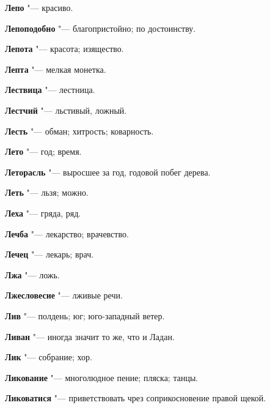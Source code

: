 \begin{mymulticols}{2}
\noindent\textbf{Лепо} "--- красиво. 




\noindent\textbf{Лепоподобно} "--- благопристойно; по достоинству. 




\noindent\textbf{Лепота} "--- красота; изящество. 




\noindent\textbf{Лепта} "--- мелкая монетка. 




\noindent\textbf{Лествица} "--- лестница. 




\noindent\textbf{Лестчий} "--- льстивый, ложный. 




\noindent\textbf{Лесть} "--- обман; хитрость; коварность. 




\noindent\textbf{Лето} "--- год; время. 




\noindent\textbf{Леторасль} "--- выросшее за год, годовой побег дерева. 




\noindent\textbf{Леть} "--- льзя; можно. 




\noindent\textbf{Леха} "--- гряда, ряд. 




\noindent\textbf{Лечба} "--- лекарство; врачевство. 




\noindent\textbf{Лечец} "--- лекарь; врач. 




\noindent\textbf{Лжа} "--- ложь. 




\noindent\textbf{Лжесловесие} "--- лживые речи. 




\noindent\textbf{Лив} "--- полдень; юг; юго-западный ветер. 




\noindent\textbf{Ливан} "--- иногда значит то же, что и Ладан. 




\noindent\textbf{Лик} "--- собрание; хор. 




\noindent\textbf{Ликование} "--- многолюдное пение; пляска; танцы. 




\noindent\textbf{Ликоватися} "--- приветствовать чрез соприкосновение правой щекой. 





\end{mymulticols}
